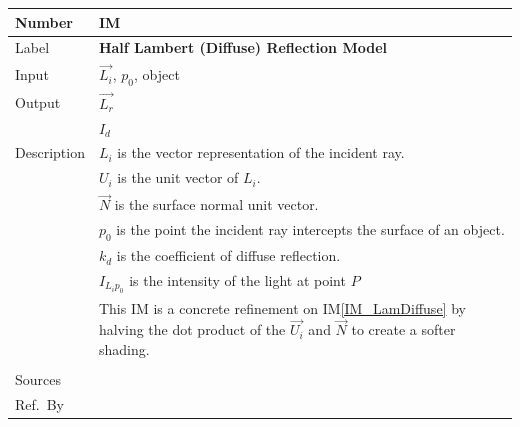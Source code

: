 \documentclass[12pt]{article}
\newcommand{\colAwidth}{0.13\textwidth}
\newcommand{\colBwidth}{0.82\textwidth}
\newcounter{instnum} %
\newcommand{\iref}[1]{IM\ref{#1}}
\begin{document}
\noindent
\begin{minipage}{\textwidth}
	\renewcommand*{\arraystretch}{1.5}
	\begin{tabular}{| p{\colAwidth} | p{\colBwidth}|}
		\hline
		\rowcolor[gray]{0.9}
		Number& IM{instnum}\theinstnum \label{IM_HalfLam}\\
		\hline
		Label& \bf Half Lambert (Diffuse) Reflection Model\\
		\hline
		Input& $\vec{L_{i}}$, $p_{0}$, object\\
		\hline
		Output&  $\vec{L_{r}}$  \\
		&  $I_{d}$\\
		\hline
		Description & $L_{i}$ is the vector representation of the incident 
		ray.\\
		& $U_{i}$ is the unit vector of $L_{i}$.\\
		& $\vec{N}$ is the surface normal unit vector. \\
		& $p_{0}$ is the point the incident ray intercepts the surface of an 
		object. \\
		& $k_{d}$  is the coefficient of diffuse reflection.\\
		& $I_{L_{i}p_{0}}$ is the intensity of the light at point $P$\\
		& This IM is a concrete refinement on \iref{IM_LamDiffuse} by halving 
		the dot product of the $\vec{U_{i}}$ and $\vec{N}$ to create a softer 
		shading.\\
		\\
		\hline
		Sources& \cite{Comninos2005,Lengyel2003,shreiner2012} \\
		\hline
		Ref.\ By & \\
		\hline
	\end{tabular}
\end{minipage}\\

~\newline
\end{document}
